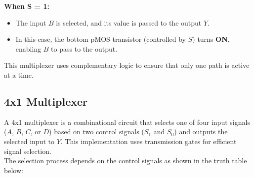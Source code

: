 \documentclass[a4paper,12pt]{article}
\begin{document}
\textbf{	When S = 1:}
	\begin{itemize}
		\item The input \(B\) is selected, and its value is passed to the output \(Y\).
		\item In this case, the bottom pMOS transistor (controlled by \(S\)) turns \textbf{ON}, enabling \(B\) to pass to the output.
	\end{itemize}
	
	This multiplexer uses complementary logic to ensure that only one path is active at a time.
	
	
	
	\newpage
		\subsection{4x1 Multiplexer}

	
	A 4x1 multiplexer is a combinational circuit that selects one of four input signals (\(A\), \(B\), \(C\), or \(D\)) based on two control signals (\(S_1\) and \(S_0\)) and outputs the selected input to \(Y\). This implementation uses transmission gates for efficient signal selection.\\
	The selection process depends on the control signals as shown in the truth table below:
	
\end{document}
